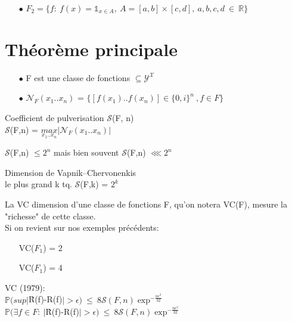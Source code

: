 \documentclass[a4paper]{report}
\begin{document}
\begin{itemize}
\item[$\bullet$] $F_2 = \{f:\ f(x)=\mathds{1}_{x\in A},\ A=[a,b]\times[c,d],\ a,b,c,d\ \in \ \mathds{R}\}$\\
\end{itemize}

\section{Théorème principale}
\begin{itemize}
\item[$\bullet$] F est une classe de fonctions $ \subseteq \mathcal{Y}^\mathcal{X}$\\
\item[$\bullet$] $\mathcal{N}_F (x_1..x_n)$ = $\{[f(x_1)..f(x_n)]\in \{0,i\}^n \ ,f\in F\}$\\
\end{itemize}

\begin{definition}
Coefficient de pulverisation $\mathcal{S}$(F, n)\\
$\mathcal{S}$(F,n) = $\underset{x_1..x_n}{max}|\mathcal{N}_F (x_1..x_n)|$\\
\end{definition}

\begin{remark}
$\mathcal{S}$(F,n) $ \leq 2^n$ mais bien souvent $\mathcal{S}$(F,n) $ \lll 2^n $\\
\end{remark}

\begin{definition}
Dimension de Vapnik–Chervonenkis\\
le plus grand k tq. $\mathcal{S}$(F,k) = $2^k$\\
\end{definition}

La VC dimension d'une classe de fonctions F, qu'on  notera VC(F), mesure la "richesse" de cette classe.\\
Si on revient sur nos exemples précédents:
\begin{itemize}
\item[]VC($F_1$) = 2
\item[]VC($F_1$) = 4\\
\end{itemize}

\begin{theorem}
VC (1979):\\
$\mathds{P}(sup|$\^R(f)-R(f)$| > \epsilon)\ \leq \ 8\mathcal{S}(F,n) \exp ^{-\frac{n\epsilon^2}{32}}$\\
$\mathds{P}(\exists f \in F:\ |$\^R(f)-R(f)$| > \epsilon)\ \leq \ 8\mathcal{S}(F,n)\exp ^{-\frac{n\epsilon^2}{32}}$\\
\end{theorem}
\end{document}
